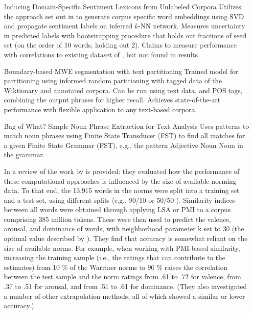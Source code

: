 \cite{hamilton2016inducing}
Inducing Domain-Specific Sentiment Lexicons from Unlabeled Corpora
Utilizes the approach set out in \cite{velikovich2010viability} to generate corpus specific word embeddings using SVD and propagate sentiment labels on inferred $k$-NN network.
Measures uncertainty in predicted labels with bootstrapping procedure that holds out fractions of seed set (on the order of 10 words, holding out 2).
Claims to measure performance with correlations to existing dataset of \cite{warriner2013norms}, but not found in results.

\cite{williams2016boundary}
Boundary-based MWE segmentation with text partitioning
Trained model for partitioning using informed random partitioning with tagged data of the Wiktionary and annotated corpora.
Can be run using text data, and POS tags, combining the output phrases for higher recall.
Achieves state-of-the-art performance with flexible application to any text-based corpora.

\cite{handler2016bag}
Bag of What? Simple Noun Phrase Extraction for Text Analysis
Uses patterns to match noun phrases using Finite State Transducer (FST) to find all matches for a given Finite State Grammar (FST), e.g., the pattern Adjective Noun Noun in the grammar.

\cite{mandera2015useful}
In \cite{van2016estimating} a review of the work by \cite{mandera2015useful} is provided: they evaluated how the performance of these computational approaches is influenced by the size of available norming data.
To that end, the 13,915 words in the \cite{warriner2013norms} norms were split into a training set and a test set, using different splits (e.g., 90/10 or 50/50 ).
Similarity indices between all words were obtained through applying LSA or PMI to a corpus comprising 385 million tokens.
These were then used to predict the valence, arousal, and dominance of words, with neighborhood parameter k set to 30 (the optimal value described by \cite{bestgen2012checking}).
They find that accuracy is somewhat reliant on the size of available norms. For example, when working with PMI-based similarity, increasing the training sample (i.e., the ratings that can contribute to the estimates) from 10 \% of the Warriner norms to 90 \% raises the correlation between the test sample and the norm ratings from .61 to .72 for valence, from .37 to .51 for arousal, and from .51 to .61 for dominance.
(They also investigated a number of other extrapolation methods, all of which showed a similar or lower accuracy.)

